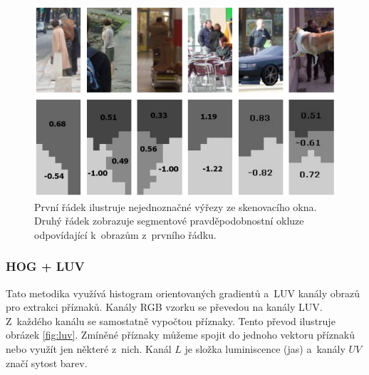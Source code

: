 \begin{figure}[H]
\centering
\includegraphics[width=.6\linewidth]{figures/hoglbp_obr}
\caption{První řádek ilustruje nejednoznačné výřezy ze skenovacího okna. Druhý řádek zobrazuje segmentové pravděpodobnostní okluze odpovídající k~obrazům z~prvního řádku.\cite{hoglpb}}
\label{fig:hoglbp}
\end{figure}

\subsubsection*{HOG + LUV}
Tato metodika \cite{hogluv} využívá histogram orientovaných gradientů a~LUV kanály obrazů pro extrakci příznaků. Kanály RGB vzorku se převedou na kanály LUV. Z~každého kanálu se samostatně vypočtou příznaky. Tento převod ilustruje obrázek \ref{fig:luv}. Zmíněné příznaky můžeme spojit do jednoho vektoru příznaků nebo využít jen některé z~nich. Kanál $L$ je složka luminiscence (jas) a~kanály $UV$ značí sytost barev. 

